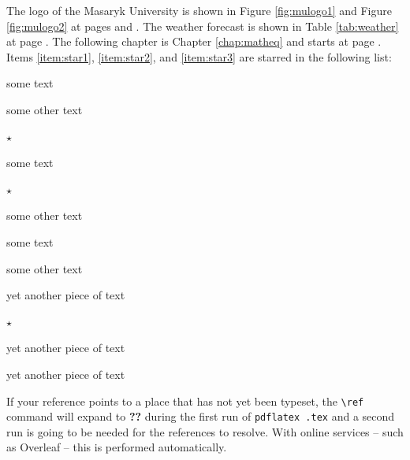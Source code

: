 \documentclass[
  digital, %
  oneside, %
  table,   %
  lof,     %
  lot,     %
]{fithesis3}
\begin{document}
The logo of the Masaryk University is shown in Figure
\ref{fig:mulogo1} and Figure \ref{fig:mulogo2} at pages
\pageref{fig:mulogo1} and \pageref{fig:mulogo2}. The weather
forecast is shown in Table \ref{tab:weather} at page
\pageref{tab:weather}. The following chapter is Chapter
\ref{chap:matheq} and starts at page \pageref{chap:matheq}.
Items \ref{item:star1}, \ref{item:star2}, and
\ref{item:star3} are starred in the following list:
\begin{compactenum}
  \item some text
  \item some other text
  \item $\star$ \label{item:star1}
  \begin{compactenum}
    \item some text
    \item $\star$ \label{item:star2}
    \item some other text
    \begin{compactenum}
      \item some text
      \item some other text
      \item yet another piece of text
      \item $\star$ \label{item:star3}
    \end{compactenum}
    \item yet another piece of text
  \end{compactenum}
  \item yet another piece of text
\end{compactenum}
If your reference points to a place that has not yet been typeset,
the \verb"\ref" command will expand to \textbf{??} during the first
run of
\texttt{pdflatex \jobname.tex}
and a second run is going to be needed for the references to
resolve. With online services -- such as Overleaf -- this is
performed automatically.
\end{document}

